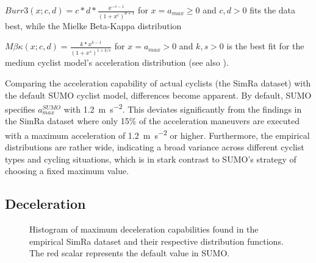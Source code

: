 $Burr3(x; c,d) = c*d*\frac{x^{-c-1}}{(1+x^c)^{d+1}}$ for $x = a_{max} \geq 0$ and $c,d > 0$ fits the data best, while the Mielke Beta-Kappa distribution~\cite{mielke1973another}

$M\beta\kappa(x; c,d) = \frac{k*x^{k-1}}{(1+x^s)^{1+k/s}}$ for $x = a_{max} > 0$ and $k,s > 0$ is the best fit for the medium cyclist model's acceleration distribution (see also ).

Comparing the acceleration capability of actual cyclists (the SimRa dataset) with the default SUMO cyclist model, differences become apparent.
By default, SUMO specifies $a_{max}^{SUMO}$ with \SI{1.2}{\metre\per\square\second}.
This deviates significantly from the findings in the SimRa dataset where only \num{15}\% of the acceleration maneuvers are executed with a maximum acceleration of \SI{1.2}{\metre\per\square\second} or higher.
Furthermore, the empirical distributions are rather wide, indicating a broad variance across different cyclist types and cycling situations, which is in stark contrast to SUMO's strategy of choosing a fixed maximum value.

\subsection{Deceleration}
\label{subsec:deceleration_preprocessing}

\begin{figure}
    \centering
    \hfill
    \caption{%
        Histogram of maximum deceleration capabilities found in the empirical SimRa dataset and their respective distribution functions.
        The red scalar represents the default value in SUMO.
    }%
    \label{fig:analysis_max_deceleration_dist_fit}
\end{figure}

